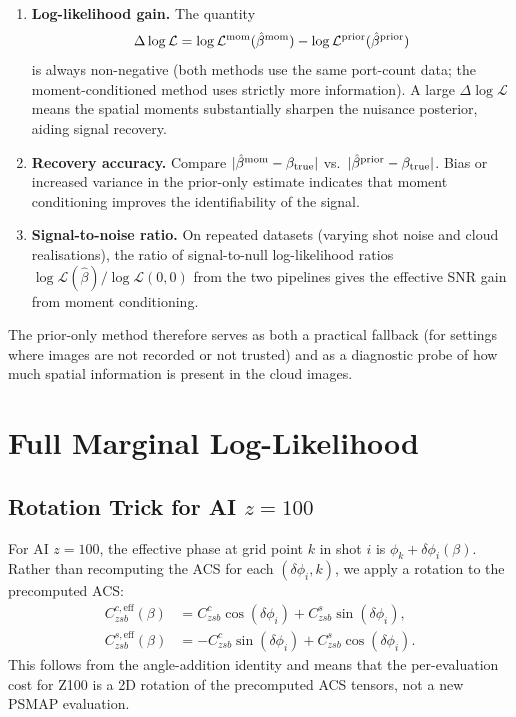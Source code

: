 \documentclass[11pt,a4paper]{article}
\begin{document}
\begin{enumerate}
  \item \textbf{Log-likelihood gain.}
    The quantity
    \begin{equation}
      \Delta\log\mathcal{L}
      = \log\mathcal{L}^{\rm mom}(\hat\beta^{\rm mom})
        - \log\mathcal{L}^{\rm prior}(\hat\beta^{\rm prior})
    \end{equation}
    is always non-negative (both methods use the same port-count data; the
    moment-conditioned method uses strictly more information).  A large
    $\Delta\log\mathcal{L}$ means the spatial moments substantially sharpen
    the nuisance posterior, aiding signal recovery.

  \item \textbf{Recovery accuracy.}
    Compare $|\hat\beta^{\rm mom} - \beta_{\rm true}|$ vs.\
    $|\hat\beta^{\rm prior} - \beta_{\rm true}|$.  Bias or increased variance
    in the prior-only estimate indicates that moment conditioning improves
    the identifiability of the signal.

  \item \textbf{Signal-to-noise ratio.}
    On repeated datasets (varying shot noise and cloud realisations), the
    ratio of signal-to-null log-likelihood ratios
    $\log\mathcal{L}(\hat\beta)/\log\mathcal{L}(0,0)$ from the two
    pipelines gives the effective SNR gain from moment conditioning.
\end{enumerate}

The prior-only method therefore serves as both a practical fallback (for
settings where images are not recorded or not trusted) and as a diagnostic
probe of how much spatial information is present in the cloud images.

\section{Full Marginal Log-Likelihood}

\subsection{Rotation Trick for AI $z=100$}

For AI $z=100$, the effective phase at grid point $k$ in shot $i$ is
$\phi_k + \delta\phi_i(\beta)$.  Rather than recomputing the ACS for each
$(\delta\phi_i, k)$, we apply a rotation to the precomputed ACS:
\begin{align}
  C^{c,\mathrm{eff}}_{zsb}(\beta)
  &= C^c_{zsb}\cos(\delta\phi_i) + C^s_{zsb}\sin(\delta\phi_i), \\
  C^{s,\mathrm{eff}}_{zsb}(\beta)
  &= -C^c_{zsb}\sin(\delta\phi_i) + C^s_{zsb}\cos(\delta\phi_i).
\end{align}
This follows from the angle-addition identity and means that the per-evaluation
cost for Z100 is a 2D rotation of the precomputed ACS tensors, not a new PSMAP
evaluation.
\end{document}
